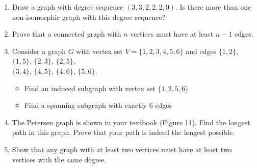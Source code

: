 \documentclass{article}
\theoremstyle{definition}
\begin{document}
\begin{enumerate}[resume]
\item Draw a graph with degree sequence $(3,3,2,2,2,0)$. Is there more than one non-isomorphic graph with this degree sequence?

\item Prove that a connected graph with $n$ vertices must have at least $n-1$ edges.

\item Consider a graph $G$ with vertex set $V = \{1,2,3,4,5,6\}$ and edges 
$\{1,2\}$, $\{1,5\}$, $\{2,3\}$, $\{2,5\}$,\\
$\{3,4\}$, $\{4,5\}$, $\{4,6\}$, $\{5,6\}$.
\begin{center}
\end{center}
\begin{itemize}
    \item Find an induced subgraph with vertex set $\{1,2,5,6\}$
    \item Find a spanning subgraph with exactly 6 edges
\end{itemize}

\item The Petersen graph is shown in your textbook (Figure 11). Find the longest path in this graph. Prove that your path is indeed the longest possible.

\item Show that any graph with at least two vertices must have at least two vertices with the same degree.

\end{enumerate}
\end{document}
